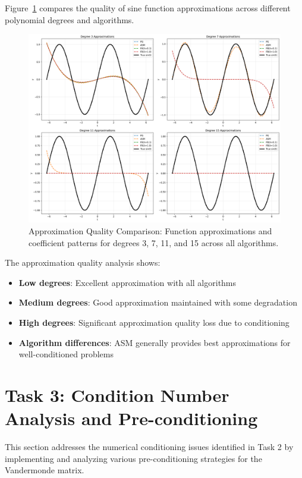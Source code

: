 \documentclass[11pt,a4paper]{article}
\begin{document}
Figure~\ref{fig:task2_approximations} compares the quality of sine function approximations across different polynomial degrees and algorithms.

\begin{figure}[h]
\centering
\includegraphics[width=\textwidth]{../results/plots/task2_approximation_comparison.png}
\caption{Approximation Quality Comparison: Function approximations and coefficient patterns for degrees 3, 7, 11, and 15 across all algorithms.}
\label{fig:task2_approximations}
\end{figure}

The approximation quality analysis shows:
\begin{itemize}
    \item \textbf{Low degrees}: Excellent approximation with all algorithms
    \item \textbf{Medium degrees}: Good approximation maintained with some degradation
    \item \textbf{High degrees}: Significant approximation quality loss due to conditioning
    \item \textbf{Algorithm differences}: ASM generally provides best approximations for well-conditioned problems
\end{itemize}

\section{Task 3: Condition Number Analysis and Pre-conditioning}

This section addresses the numerical conditioning issues identified in Task 2 by implementing and analyzing various pre-conditioning strategies for the Vandermonde matrix.
\end{document}
